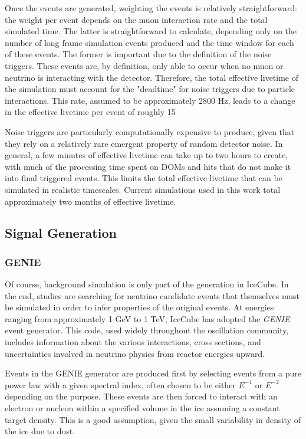 Once the events are generated, weighting the events is relatively straightforward: the weight per event depends on the muon interaction rate and the total simulated time.
The latter is straightforward to calculate, depending only on the number of long frame simulation events produced and the time window for each of these events.
The former is important due to the definition of the noise triggers. 
These events are, by definition, only able to occur when no muon or neutrino is interacting with the detector. 
Therefore, the total effective livetime of the simulation must account for the "deadtime" for noise triggers due to particle interactions.
This rate, assumed to be approximately 2800 Hz, leads to a change in the effective livetime per event of roughly 15%

Noise triggers are particularly computationally expensive to produce, given that they rely on a relatively rare emergent property of random detector noise. 
In general, a few minutes of effective livetime can take up to two hours to create, with much of the processing time spent on DOMs and hits that do not make it into final triggered events.
This limits the total effective livetime that can be simulated in realistic timescales.
Current simulations used in this work total approximately two months of effective livetime.

\label{subsec:signal_generation}
\subsection{Signal Generation}
\label{subsubsec:genie}
\subsubsection{GENIE}
Of course, background simulation is only part of the generation in IceCube. 
In the end, studies are searching for neutrino candidate events that themselves must be simulated in order to infer properties of the original events.
At energies ranging from approximately 1 GeV to 1 TeV, IceCube has adopted the \emph{GENIE} event generator.
This code, used widely throughout the oscillation community, includes information about the various interactions, cross sections, and uncertainties involved in neutrino physics from reactor energies upward.

Events in the GENIE generator are produced first by selecting events from a pure power law with a given spectral index, often chosen to be either $E^{-1}$ or $E^{-2}$ depending on the purpose.
These events are then forced to interact with an electron or nucleon within a specified volume in the ice assuming a constant target density.
This is a good assumption, given the small variability in density of the ice due to dust.

